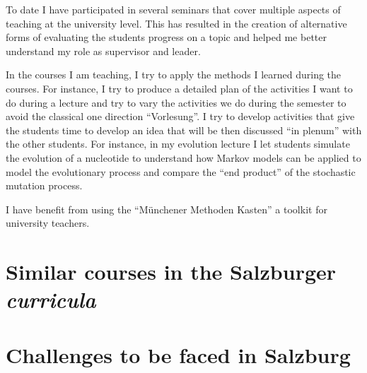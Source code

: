 \documentclass[a4paper,11pt]{article}
\begin{document}
To date I have participated in several seminars that cover multiple aspects of teaching at the university level. This has resulted in the creation of alternative forms of evaluating the students progress on a topic and helped me better understand my role as supervisor and leader.

In the courses I am teaching, I try to apply the methods I learned during the courses. For instance, I try to produce a detailed plan of the activities I want to do during a lecture and try to vary the activities we do during the semester to avoid the classical one direction ``Vorlesung''. I try to develop activities that give the students time to develop an idea that will be then discussed ``in plenum'' with the other students. For instance, in my evolution lecture I let students simulate the evolution of a nucleotide to understand how Markov models can be applied to model the evolutionary process and compare the ``end product'' of the stochastic mutation process.

I have benefit from using the ``M\"unchener Methoden Kasten'' a toolkit for university teachers.

\section*{Similar courses in the Salzburger \emph{curricula}}


\section*{Challenges to be faced in Salzburg}







\newpage

\begingroup
\parindent 0pt
\def\enotesize{\footnotesize}
\theendnotes
\endgroup

\end{document}
